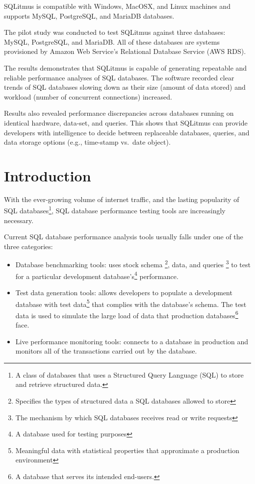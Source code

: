 \documentclass[12pt]{report}
\begin{document}
\begin{spacing}{1.9}
		SQLitmus is compatible with Windows, MacOSX, and Linux machines and supports MySQL, PostgreSQL, and MariaDB databases. 
		
		The pilot study was conducted to test SQLitmus against three databases: MySQL, PostgreSQL, and MariaDB. All of these databases are systems provisioned by Amazon Web Service's Relational Database Service (AWS RDS). 
		
		The results demonstrates that SQLitmus is capable of generating repeatable and reliable performance analyses of SQL databases. The software recorded clear trends of SQL databases slowing down as their size (amount of data stored) and workload (number of concurrent connections) increased. 
		
		Results also revealed performance discrepancies across databases running on identical hardware, data-set, and queries. This shows that SQLitmus can provide developers with intelligence to decide between replaceable databases, queries, and data storage options (e.g., time-stamp vs.\ date object).  
		
		\clearpage
		
		\tableofcontents
		
		\clearpage
		
		\listoffigures
		
		\clearpage
		
		\chapter{Introduction}
		
		With the ever-growing volume of internet traffic, and the lasting popularity of SQL databases\footnote{A class of databases that uses a Structured Query Language (SQL) to store and retrieve structured data. }, SQL database performance testing tools are increasingly necessary.
		
		Current SQL database performance analysis tools usually falls under one of the three categories:
		
		\begin{itemize}
			\item Database benchmarking tools: uses stock schema \footnote{Specifies the types of structured data a SQL databases allowed to store}, data, and queries \footnote{The mechanism by which SQL databases receives read or write requests} to test for a particular development database's\footnote{A database used for testing purposes} performance.
			\item Test data generation tools: allows developers to populate a development database with test data\footnote{Meaningful data with statistical properties that approximate a production environment} that complies with the database's schema. The test data is used to simulate the large load of data that production databases\footnote{A database that serves its intended end-users.} face.
			\item Live performance monitoring tools: connects to a database in production and monitors all of the transactions carried out by the database.
		\end{itemize}
		

\end{spacing}
\end{document}
